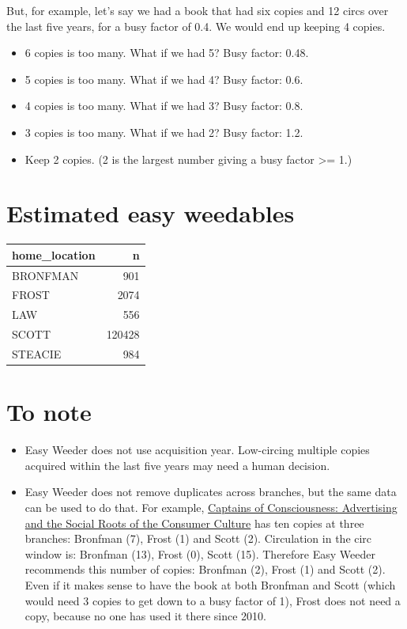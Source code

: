 \documentclass[11pt]{article}
\begin{document}
But, for example, let's say we had a book that had six copies and 12 circs over the last five years, for a busy factor of 0.4.  We would end up keeping 4 copies.

\begin{itemize}
\item 6 copies is too many.  What if we had 5? Busy factor: 0.48.
\item 5 copies is too many.  What if we had 4? Busy factor: 0.6.
\item 4 copies is too many.  What if we had 3? Busy factor: 0.8.
\item 3 copies is too many.  What if we had 2? Busy factor: 1.2.
\item Keep 2 copies.  (2 is the largest number giving a busy factor >= 1.)
\end{itemize}

\section*{Estimated easy weedables}
\label{sec:org8289fc4}

\begin{center}
\begin{tabular}{lr}
home\_location & n\\
\hline
BRONFMAN & 901\\
FROST & 2074\\
LAW & 556\\
SCOTT & 120428\\
STEACIE & 984\\
\end{tabular}
\end{center}

\section*{To note}
\label{sec:org531e42a}

\begin{itemize}
\item Easy Weeder does not use acquisition year.  Low-circing multiple copies acquired within the last five years may need a human decision.
\item Easy Weeder does not remove duplicates across branches, but the same data can be used to do that. For example, \href{https://www.library.yorku.ca/find/Record/1172}{Captains of Consciousness: Advertising and the Social Roots of the Consumer Culture} has ten copies at three branches: Bronfman (7), Frost (1) and Scott (2).  Circulation in the circ window is: Bronfman (13), Frost (0), Scott (15).  Therefore Easy Weeder recommends this number of copies: Bronfman (2), Frost (1) and Scott (2).  Even if it makes sense to have the book at both Bronfman and Scott (which would need 3 copies to get down to a busy factor of 1), Frost does not need a copy, because no one has used it there since 2010.
\end{itemize}
\end{document}
